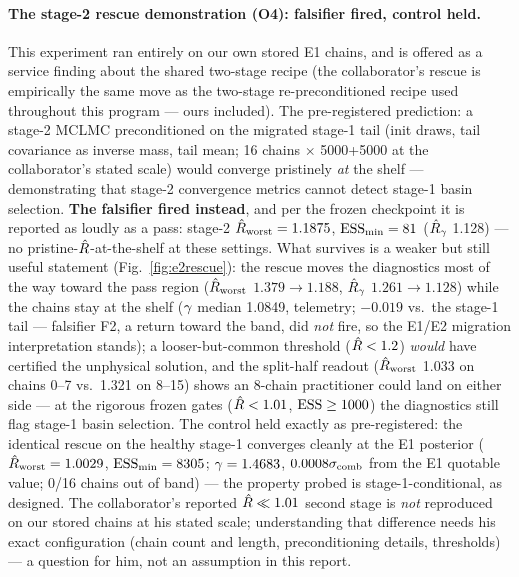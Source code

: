 \paragraph{The stage-2 rescue demonstration (O4): falsifier fired,
control held.}
This experiment ran entirely on our own stored E1 chains, and is offered
as a service finding about the shared two-stage recipe (the
collaborator's rescue is empirically the same move as the two-stage
re-preconditioned recipe used throughout this program --- ours included).
The pre-registered prediction: a stage-2 MCLMC preconditioned on the
migrated  stage-1 tail (init draws, tail covariance as inverse
mass, tail mean; 16 chains $\times$ 5000{+}5000 at the collaborator's
stated scale) would converge pristinely \emph{at} the shelf ---
demonstrating that stage-2 convergence metrics cannot detect stage-1
basin selection. \textbf{The falsifier fired instead}, and per the frozen
checkpoint it is reported as loudly as a pass: stage-2
$\hat{R}_{\rm worst}=1.1875$, $\textrm{ESS}_{\min}=81$ ($\hat{R}_\gamma$ 1.128) ---
no pristine-$\hat{R}$-at-the-shelf at these settings. What survives is a
weaker but still useful statement (Fig.~\ref{fig:e2rescue}): the rescue
moves the diagnostics most of the way toward the pass region
($\hat{R}_{\rm worst}$ $1.379\to1.188$, $\hat{R}_\gamma$ $1.261\to1.128$)
while the chains stay at the shelf ($\gamma$ median 1.0849, telemetry;
$-0.019$ vs.\ the stage-1 tail --- falsifier F2, a return toward the
band, did \emph{not} fire, so the E1/E2 migration interpretation stands);
a looser-but-common threshold ($\hat{R}<1.2$) \emph{would} have certified
the unphysical solution, and the split-half readout ($\hat{R}_{\rm worst}$
1.033 on chains 0--7 vs.\ 1.321 on 8--15) shows an 8-chain practitioner
could land on either side --- at the rigorous frozen gates
($\hat{R}<1.01$, $\textrm{ESS}\ge1000$) the diagnostics still flag stage-1 basin
selection. The control held exactly as pre-registered: the identical
rescue on the healthy  stage-1 converges cleanly at the E1
posterior ($\hat{R}_{\rm worst}=1.0029$, $\textrm{ESS}_{\min}=8305$;
$\gamma=1.4683$, $0.0008\sigma_{\rm comb}$ from the E1 quotable value;
0/16 chains out of band) --- the property probed is stage-1-conditional,
as designed. The collaborator's reported $\hat{R}\ll1.01$ second stage is
\emph{not} reproduced on our stored chains at his stated scale;
understanding that difference needs his exact configuration (chain count
and length, preconditioning details, thresholds) --- a question for him,
not an assumption in this report.%

